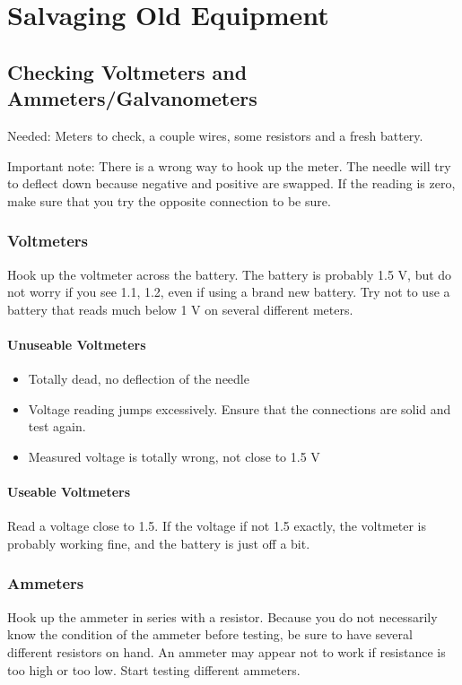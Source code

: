 \chapter{Salvaging Old Equipment} 
\label{cha:salvaging-equip}

\section{Checking Voltmeters and Ammeters/Galvanometers}  
\label{cha:voltamm}
Needed: Meters to check, 
a couple wires, 
some resistors and a fresh battery.

Important note: There is a wrong way to hook up the meter. 
The needle will try to deflect down 
because negative and positive are swapped. 
If the reading is zero, 
make sure that you try the opposite connection to be sure.

\subsection{Voltmeters} 
Hook up the voltmeter across the battery. 
The battery is probably 1.5 V, 
but do not worry if you see 1.1, 
1.2, 
even if using a brand new battery. 
Try not to use a battery that reads much below 1 V 
on several different meters.

\subsubsection{Unuseable Voltmeters}
\begin{itemize}
\item{Totally dead, no deflection of the needle}
\item{Voltage reading jumps excessively. 
Ensure that the connections are solid and test again.}
\item{Measured voltage is totally wrong, not close to 1.5 V}
\end{itemize}

\subsubsection{Useable Voltmeters}
Read a voltage close to 1.5. 
If the voltage if not 1.5 exactly, 
the voltmeter is probably working fine, 
and the battery is just off a bit.

\subsection{Ammeters}
Hook up the ammeter in series with a resistor. 
Because you do not necessarily know the condition of the ammeter before testing, 
be sure to have several different resistors on hand. 
An ammeter may appear not to work if resistance is too high or too low. 
Start testing different ammeters.

